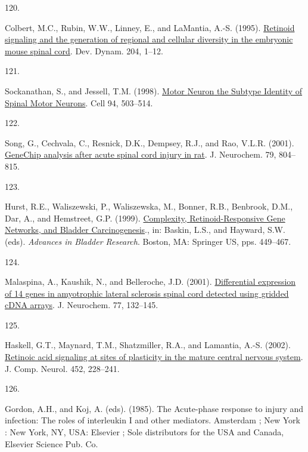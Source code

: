 \documentclass[
]{article}
\newlength{\cslhangindent}
\newlength{\csllabelwidth}
\newlength{\cslentryspacingunit} %
\newenvironment{CSLReferences}[2] %
 {%
  \setlength{\parindent}{0pt}
  \ifodd #1
  \let\oldpar\par
  \def\par{\hangindent=\cslhangindent\oldpar}
  \fi
  \setlength{\parskip}{#2\cslentryspacingunit}
 }%
 {}
\newcommand{\CSLLeftMargin}[1]{\parbox[t]{\csllabelwidth}{#1}}
\newcommand{\CSLRightInline}[1]{\parbox[t]{\linewidth - \csllabelwidth}{#1}\break}
\begin{document}
\begin{CSLReferences}{0}{0}
\leavevmode{}%
\CSLLeftMargin{120. }
\CSLRightInline{Colbert, M.C., Rubin, W.W., Linney, E., and LaMantia, A.-S. (1995). \href{https://doi.org/10.1002/aja.1002040102}{{Retinoid signaling and the generation of regional and cellular diversity in the embryonic mouse spinal cord}}. Dev. Dynam. 204, 1--12.}

\leavevmode{}%
\CSLLeftMargin{121. }
\CSLRightInline{Sockanathan, S., and Jessell, T.M. (1998). \href{https://doi.org/10.1016/S0092-8674(00)81591-3}{Motor {Neuron}\textendash{{Derived Retinoid Signaling Specifies}} the {Subtype Identity} of {Spinal Motor Neurons}}. Cell 94, 503--514.}

\leavevmode{}%
\CSLLeftMargin{122. }
\CSLRightInline{Song, G., Cechvala, C., Resnick, D.K., Dempsey, R.J., and Rao, V.L.R. (2001). \href{https://doi.org/10.1046/j.1471-4159.2001.00626.x}{{GeneChip} analysis after acute spinal cord injury in rat}. J. Neurochem. 79, 804--815.}

\leavevmode{}%
\CSLLeftMargin{123. }
\CSLRightInline{Hurst, R.E., Waliszewski, P., Waliszewska, M., Bonner, R.B., Benbrook, D.M., Dar, A., and Hemstreet, G.P. (1999). \href{https://doi.org/10.1007/978-1-4615-4737-2_35}{Complexity, {Retinoid-Responsive Gene Networks}, and {Bladder Carcinogenesis}}., in: Baskin, L.S., and Hayward, S.W. (eds). \emph{Advances in {Bladder Research}}. {Boston, MA}: {Springer US}, pps. 449--467.}

\leavevmode{}%
\CSLLeftMargin{124. }
\CSLRightInline{Malaspina, A., Kaushik, N., and Belleroche, J.D. (2001). \href{https://doi.org/10.1046/j.1471-4159.2001.00231.x}{Differential expression of 14 genes in amyotrophic lateral sclerosis spinal cord detected using gridded {cDNA} arrays}. J. Neurochem. 77, 132--145.}

\leavevmode{}%
\CSLLeftMargin{125. }
\CSLRightInline{Haskell, G.T., Maynard, T.M., Shatzmiller, R.A., and Lamantia, A.-S. (2002). \href{https://doi.org/10.1002/cne.10369}{Retinoic acid signaling at sites of plasticity in the mature central nervous system}. J. Comp. Neurol. 452, 228--241.}

\leavevmode{}%
\CSLLeftMargin{126. }
\CSLRightInline{Gordon, A.H., and Koj, A. (eds). (1985). The {Acute-phase} response to injury and infection: The roles of interleukin {I} and other mediators. {Amsterdam ; New York : New York, NY, USA}: {Elsevier ; Sole distributors for the USA and Canada, Elsevier Science Pub. Co}.}


\end{CSLReferences}
\end{document}
